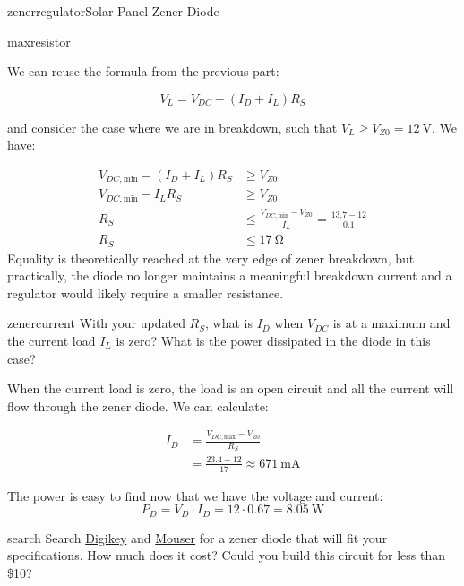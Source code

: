 \begin{mainquestion}{zenerregulator}{Solar Panel Zener Diode}
\begin{partquestion}{maxresistor}
\begin{answer}
We can reuse the formula from the previous part:

\[
V_L = V_{DC} - (I_D + I_L) R_S
\]

and consider the case where we are in breakdown, such that $V_L \geq V_{Z0} = \qty{12}{\volt}$. We have:

\begin{align*}
V_{DC,\text{min}} - (I_D + I_L) R_S &\geq V_{Z0} \\
V_{DC,\text{min}} - I_L R_S &\geq V_{Z0} \\
R_S &\leq \frac{V_{DC,\text{min}} - V_{Z0}}{I_L} = \frac{13.7 - 12}{0.1} \\
R_S &\leq \qty{17}{\ohm}
\end{align*}
Equality is theoretically reached at the very edge of zener breakdown, but practically, the diode no longer maintains a meaningful breakdown current and a regulator would likely require a smaller resistance.
\end{answer}
\end{partquestion}

\begin{partquestion}{zenercurrent}
{With your updated $R_S$, what is $I_D$ when $V_{DC}$ is at a maximum and the current load $I_L$ is zero? What is the power dissipated in the diode in this case?}

\begin{answer}
When the current load is zero, the load is an open circuit and all the current will flow through the zener diode. We can calculate:

\begin{align*}
I_D &= \frac{V_{DC,\text{max}} - V_{Z0}}{R_S} \\
&= \frac{23.4 - 12}{17} \approx \qty{671}{\milli\ampere}
\end{align*}

The power is easy to find now that we have the voltage and current:
\[P_D = V_D \cdot I_D = 12 \cdot 0.67 = \qty{8.05}{\watt}\]

\end{answer}
\end{partquestion}

\begin{partquestion}{search}
{Search \href{https://www.digikey.com/}{Digikey} and \href{https://www.mouser.com/?srsltid=AfmBOoo5j27SqCXjzHUROxjIwUmXG71N7j6Ma3DKRVKD3fQJOXdC2enf}{Mouser} for a zener diode that will fit your specifications. How much does it cost? Could you build this circuit for less than \$10?}


\end{partquestion}
\end{mainquestion}
